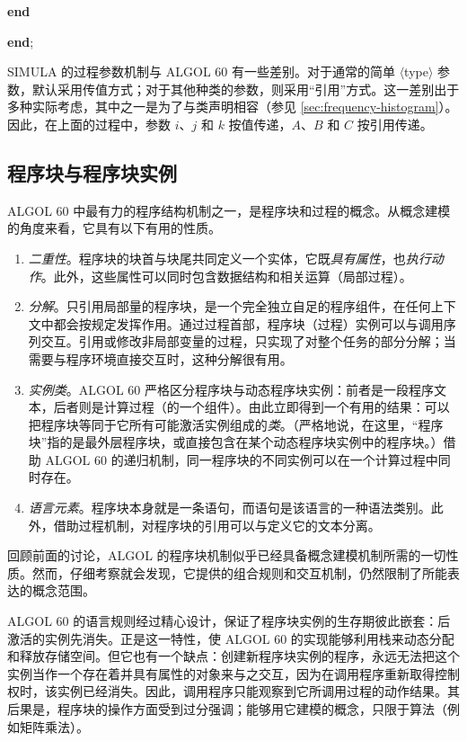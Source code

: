 \documentclass[twoside,11pt,fontset=none]{ctexbook}
\begin{document}
\quad \quad \textbf{end}

\quad \textbf{end};

SIMULA 的过程参数机制与 ALGOL 60 有一些差别。对于通常的简单 $\langle$type$\rangle$ 参数，默认采用传值方式；对于其他种类的参数，则采用“引用”方式。这一差别出于多种实际考虑，其中之一是为了与类声明相容（参见 \ref{sec:frequency-histogram}）。因此，在上面的过程中，参数 $i$、$j$ 和 $k$ 按值传递，$A$、$B$ 和 $C$ 按引用传递。

\subsection{程序块与程序块实例}

ALGOL 60 中最有力的程序结构机制之一，是程序块和过程的概念。从概念建模的角度来看，它具有以下有用的性质。

\begin{enumerate}[wide, nosep, label=(\arabic*)]
	\item \textit{二重性}。程序块的块首与块尾共同定义一个实体，它既\textit{具有属性}，也\textit{执行动作}。此外，这些属性可以同时包含数据结构和相关运算（局部过程）。
	
	\item \textit{分解}。只引用局部量的程序块，是一个完全独立自足的程序组件，在任何上下文中都会按规定发挥作用。通过过程首部，程序块（过程）实例可以与调用序列交互。引用或修改非局部变量的过程，只实现了对整个任务的部分分解；当需要与程序环境直接交互时，这种分解很有用。

	\item \textit{实例类}。ALGOL 60 严格区分程序块与动态程序块实例：前者是一段程序文本，后者则是计算过程（的一个组件）。由此立即得到一个有用的结果：可以把程序块等同于它所有可能激活实例组成的\textit{类}。（严格地说，在这里，“程序块”指的是最外层程序块，或直接包含在某个动态程序块实例中的程序块。）借助 ALGOL 60 的递归机制，同一程序块的不同实例可以在一个计算过程中同时存在。

	\item \textit{语言元素}。程序块本身就是一条语句，而语句是该语言的一种语法类别。此外，借助过程机制，对程序块的引用可以与定义它的文本分离。
\end{enumerate}

回顾前面的讨论，ALGOL 的程序块机制似乎已经具备概念建模机制所需的一切性质。然而，仔细考察就会发现，它提供的组合规则和交互机制，仍然限制了所能表达的概念范围。

ALGOL 60 的语言规则经过精心设计，保证了程序块实例的生存期彼此嵌套：后激活的实例先消失。正是这一特性，使 ALGOL 60 的实现能够利用栈来动态分配和释放存储空间。但它也有一个缺点：创建新程序块实例的程序，永远无法把这个实例当作一个存在着并具有属性的对象来与之交互，因为在调用程序重新取得控制权时，该实例已经消失。因此，调用程序只能观察到它所调用过程的动作结果。其后果是，程序块的操作方面受到过分强调；能够用它建模的概念，只限于算法（例如矩阵乘法）。
\end{document}
